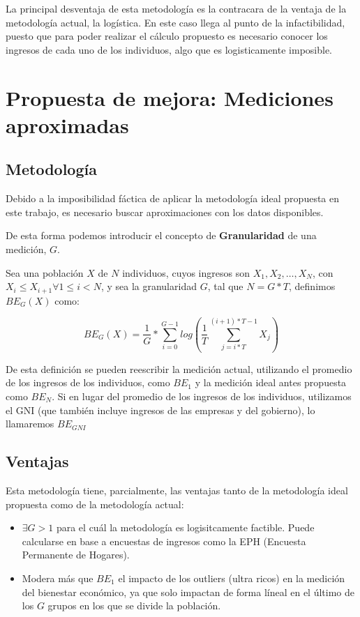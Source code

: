 La principal desventaja de esta metodología es la contracara de la ventaja de la metodología actual, la logística. En este caso llega al punto de la infactibilidad, puesto que para poder realizar el cálculo propuesto es necesario conocer los ingresos de cada uno de los individuos, algo que es logisticamente imposible.

\section{Propuesta de mejora: Mediciones aproximadas}

\subsection{Metodología}

Debido a la imposibilidad fáctica de aplicar la metodología ideal propuesta en este trabajo, es necesario buscar aproximaciones con los datos disponibles.

De esta forma podemos introducir el concepto de \textbf{Granularidad} de una medición, $G$.

Sea una población $X$ de $N$ individuos, cuyos ingresos son $X_1, X_2, \dots, X_N $, con $X_i \leq X_{i+1} \forall 1 \leq i < N$, y sea la granularidad $G$, tal que $N = G * T$, definimos $BE_G(X)$ como:

$$
    BE_G(X) = \frac{1}{G} * \sum_{i=0}^{G-1}log(\frac{1}{T} \sum_{j=i*T}^{(i+1)*T-1}X_j)
$$

De esta definición se pueden reescribir la medición actual, utilizando el promedio de los ingresos de los individuos, como $BE_1$ y la medición ideal antes propuesta como $BE_N$. Si en lugar del promedio de los ingresos de los individuos, utilizamos el GNI (que también incluye ingresos de las empresas y del gobierno), lo llamaremos $BE_{GNI}$

\subsection{Ventajas}

Esta metodología tiene, parcialmente, las ventajas tanto de la metodología ideal propuesta como de la metodología actual:

\begin{itemize}
    \item $\exists G>1$ para el cuál la metodología es logisitcamente factible. Puede calcularse en base a encuestas de ingresos como la EPH (Encuesta Permanente de Hogares).
    \item Modera más que $BE_1$ el impacto de los outliers (ultra ricos) en la medición del bienestar económico, ya que solo impactan de forma líneal en el último de los $G$ grupos en los que se divide la población.
\end{itemize}

